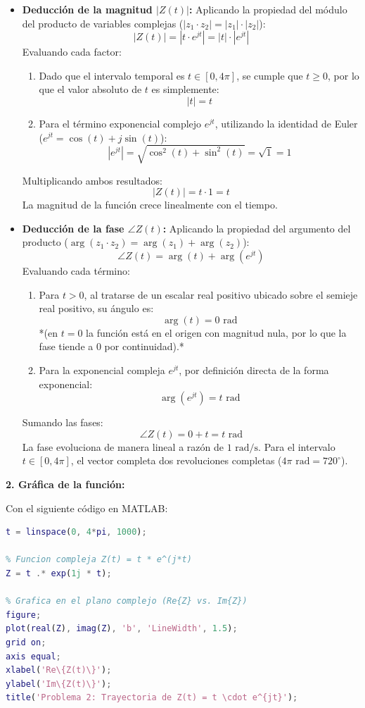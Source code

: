 \documentclass[11pt,a4paper]{article}
\begin{document}
\begin{itemize}
    \item \textbf{Deducción de la magnitud $|Z(t)|$:}
    Aplicando la propiedad del módulo del producto de variables complejas ($|z_1 \cdot z_2| = |z_1| \cdot |z_2|$):
    \[
    |Z(t)| = |t \cdot e^{jt}| = |t| \cdot |e^{jt}|
    \]
    Evaluando cada factor:
    \begin{enumerate}
        \item Dado que el intervalo temporal es $t \in [0, 4\pi]$, se cumple que $t \ge 0$, por lo que el valor absoluto de $t$ es simplemente:
        \[
        |t| = t
        \]
        \item Para el término exponencial complejo $e^{jt}$, utilizando la identidad de Euler ($e^{jt} = \cos(t) + j\sin(t)$):
        \[
        |e^{jt}| = \sqrt{\cos^2(t) + \sin^2(t)} = \sqrt{1} = 1
        \]
    \end{enumerate}
    Multiplicando ambos resultados:
    \[
    |Z(t)| = t \cdot 1 = t
    \]
    La magnitud de la función crece linealmente con el tiempo.

    \item \textbf{Deducción de la fase $\angle Z(t)$:}
    Aplicando la propiedad del argumento del producto ($\arg(z_1 \cdot z_2) = \arg(z_1) + \arg(z_2)$):
    \[
    \angle Z(t) = \arg(t) + \arg(e^{jt})
    \]
    Evaluando cada término:
    \begin{enumerate}
        \item Para $t > 0$, al tratarse de un escalar real positivo ubicado sobre el semieje real positivo, su ángulo es:
        \[
        \arg(t) = 0 \text{ rad}
        \]
        *(en $t = 0$ la función está en el origen con magnitud nula, por lo que la fase tiende a $0$ por continuidad).*
        \item Para la exponencial compleja $e^{jt}$, por definición directa de la forma exponencial:
        \[
        \arg(e^{jt}) = t \text{ rad}
        \]
    \end{enumerate}
    Sumando las fases:
    \[
    \angle Z(t) = 0 + t = t \text{ rad}
    \]
    La fase evoluciona de manera lineal a razón de $1 \text{ rad/s}$. Para el intervalo $t \in [0, 4\pi]$, el vector completa dos revoluciones completas ($4\pi \text{ rad} = 720^\circ$).
\end{itemize}

\noindent\textbf{2. Gráfica de la función:}

Con el siguiente código en MATLAB:

\begin{lstlisting}[language=Matlab, frame=single, basicstyle=\small\ttfamily, keywordstyle=\color{blue}, commentstyle=\color{green!50!black}]
% Intervalo de tiempo t en [0, 4*pi]
t = linspace(0, 4*pi, 1000);

% Funcion compleja Z(t) = t * e^(j*t)
Z = t .* exp(1j * t);

% Grafica en el plano complejo (Re{Z} vs. Im{Z})
figure;
plot(real(Z), imag(Z), 'b', 'LineWidth', 1.5);
grid on;
axis equal;
xlabel('Re\{Z(t)\}');
ylabel('Im\{Z(t)\}');
title('Problema 2: Trayectoria de Z(t) = t \cdot e^{jt}');
\end{lstlisting}
\end{document}
